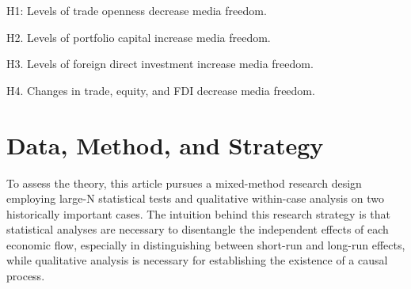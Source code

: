 \documentclass[a4paper]{article}\usepackage[]{graphicx}\usepackage[]{color}
\begin{document}
H1: Levels of trade openness decrease media freedom.

H2. Levels of portfolio capital increase media freedom.

H3. Levels of foreign direct investment increase media freedom.

H4. Changes in trade, equity, and FDI decrease media freedom.

\section{Data, Method, and Strategy}

To assess the theory, this article pursues a mixed-method research design employing large-N statistical tests and qualitative within-case analysis on two historically important cases. The intuition behind this research strategy is that statistical analyses are necessary to disentangle the independent effects of each economic flow, especially in distinguishing between short-run and long-run effects, while qualitative analysis is necessary for establishing the existence of a causal process.
\end{document}
